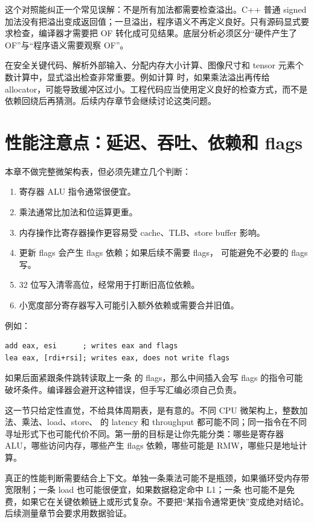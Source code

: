 这个对照能纠正一个常见误解：不是所有加法都需要检查溢出。C++ 普通 signed 加法没有把溢出变成返回值；一旦溢出，程序语义不再定义良好。只有源码显式要求检查，编译器才需要把 OF 转化成可见结果。底层分析必须区分“硬件产生了 OF”与“程序语义需要观察 OF”。

在安全关键代码、解析外部输入、分配内存大小计算、图像尺寸和 tensor 元素个数计算中，显式溢出检查非常重要。例如计算  时，如果乘法溢出再传给 allocator，可能导致缓冲区过小。工程代码应当使用定义良好的检查方式，而不是依赖回绕后再猜测。后续内存章节会继续讨论这类问题。

\section{性能注意点：延迟、吞吐、依赖和 flags}

本章不做完整微架构表，但必须先建立几个判断：

\begin{enumerate}
  \item 寄存器 ALU 指令通常很便宜。
  \item 乘法通常比加法和位运算更重。
  \item 内存操作比寄存器操作更容易受 cache、TLB、store buffer 影响。
  \item 更新 flags 会产生 flags 依赖；如果后续不需要 flags， 可能避免不必要的 flags 写。
  \item 32 位写入清零高位，经常用于打断旧高位依赖。
  \item 小宽度部分寄存器写入可能引入额外依赖或需要合并旧值。
\end{enumerate}

例如：

\begin{lstlisting}
add eax, esi      ; writes eax and flags
lea eax, [rdi+rsi]; writes eax, does not write flags
\end{lstlisting}

如果后面紧跟条件跳转读取上一条  的 flags，那么中间插入会写 flags 的指令可能破坏条件。编译器会避开这种错误，但手写汇编必须自己负责。

这一节只给定性直觉，不给具体周期表，是有意的。不同 CPU 微架构上，整数加法、乘法、load、store、 的 latency 和 throughput 都可能不同；同一指令在不同寻址形式下也可能代价不同。第一册的目标是让你先能分类：哪些是寄存器 ALU，哪些访问内存，哪些产生 flags 依赖，哪些可能是 RMW，哪些只是地址计算。

真正的性能判断需要结合上下文。单独一条乘法可能不是瓶颈，如果循环受内存带宽限制；一条 load 也可能很便宜，如果数据稳定命中 L1；一条  也可能不是免费，如果它在关键依赖链上或形式复杂。不要把“某指令通常更快”变成绝对结论。后续测量章节会要求用数据验证。

